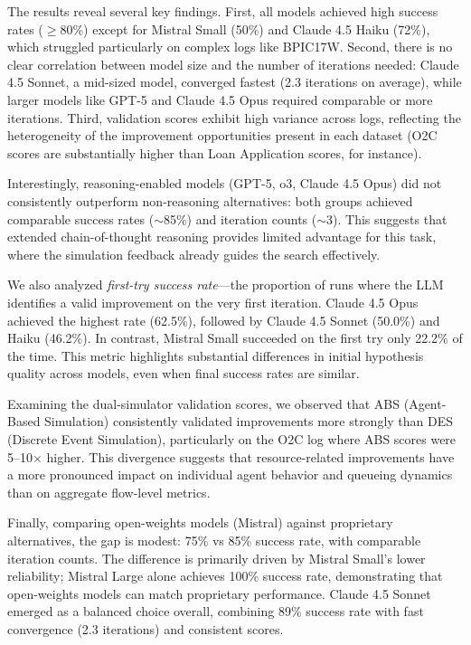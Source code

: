 \documentclass[preprint,12pt]{elsarticle}
\begin{document}
The results reveal several key findings. First, all models achieved high success rates ($\geq$80\%) except for Mistral Small (50\%) and Claude 4.5 Haiku (72\%), which struggled particularly on complex logs like BPIC17W. Second, there is no clear correlation between model size and the number of iterations needed: Claude 4.5 Sonnet, a mid-sized model, converged fastest (2.3 iterations on average), while larger models like GPT-5 and Claude 4.5 Opus required comparable or more iterations. Third, validation scores exhibit high variance across logs, reflecting the heterogeneity of the improvement opportunities present in each dataset (O2C scores are substantially higher than Loan Application scores, for instance).

Interestingly, reasoning-enabled models (GPT-5, o3, Claude 4.5 Opus) did not consistently outperform non-reasoning alternatives: both groups achieved comparable success rates ($\sim$85\%) and iteration counts ($\sim$3). This suggests that extended chain-of-thought reasoning provides limited advantage for this task, where the simulation feedback already guides the search effectively.

We also analyzed \textit{first-try success rate}---the proportion of runs where the LLM identifies a valid improvement on the very first iteration. Claude 4.5 Opus achieved the highest rate (62.5\%), followed by Claude 4.5 Sonnet (50.0\%) and Haiku (46.2\%). In contrast, Mistral Small succeeded on the first try only 22.2\% of the time. This metric highlights substantial differences in initial hypothesis quality across models, even when final success rates are similar.

Examining the dual-simulator validation scores, we observed that ABS (Agent-Based Simulation) consistently validated improvements more strongly than DES (Discrete Event Simulation), particularly on the O2C log where ABS scores were 5--10$\times$ higher. This divergence suggests that resource-related improvements have a more pronounced impact on individual agent behavior and queueing dynamics than on aggregate flow-level metrics.

Finally, comparing open-weights models (Mistral) against proprietary alternatives, the gap is modest: 75\% vs 85\% success rate, with comparable iteration counts. The difference is primarily driven by Mistral Small's lower reliability; Mistral Large alone achieves 100\% success rate, demonstrating that open-weights models can match proprietary performance. Claude 4.5 Sonnet emerged as a balanced choice overall, combining 89\% success rate with fast convergence (2.3 iterations) and consistent scores.
\end{document}
